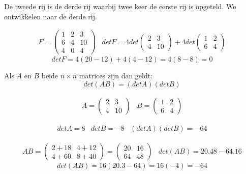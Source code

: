 	\begin{voorbeeld}
		De tweede rij is de derde rij waarbij twee keer de eerste rij is opgeteld. We ontwikkelen naar de derde rij. 
	
	\[ \begin{array}{ll} F=\left( \begin{matrix}
	1 & 2 & 3 \\ 6 & 4 & 10 \\ 4 & 0 & 4 
	\end{matrix} \right) & det F = 4 det \left( \begin{matrix} 2 & 3 \\ 4 & 10 \end{matrix} \right) + 4 det \left( \begin{matrix} 1 & 2 \\ 6 & 4 \end{matrix} \right) \end{array} \]
	\[ det F =4(20-12)+4(4-12)=4(8-8)=0 \]
	
	\end{voorbeeld}
	\begin{eigenschap}
		Als $A$ en $B$ beide $n \times n$ matrices zijn dan geldt:
	\[ det(AB)=(det A) (det B) \]
	
	\end{eigenschap}
	\begin{voorbeeld}
		
	\[ \begin{array}{ll} A=\left( \begin{matrix}
	2 & 3 \\ 4 & 10
	\end{matrix} \right) & B=\left( \begin{matrix}
	1 & 2 \\ 6 & 4
	\end{matrix} \right) \end{array} \]
	
	\[ \begin{array}{lll} det A = 8 & det B = -8 & (det A)(det B)=-64 \end{array} \]
	
	\[ \begin{array}{ll} AB=\left( \begin{matrix}
	2+18 & 4+12 \\ 4+60 & 8+40 
	\end{matrix} \right)=\left( \begin{matrix}
	20 & 16 \\ 64 & 48 
	\end{matrix} \right) & det(AB)=20.48-64.16 \end{array} \]
	\[ det(AB)=16(20.3-64)=16(-4)=-64 \]
	
	\end{voorbeeld}

